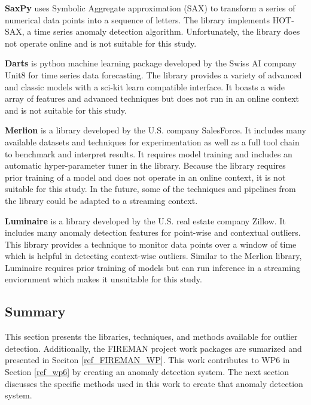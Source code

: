 \textbf{SaxPy} \parencite{senin2018grammarviz-saxpy} uses Symbolic Aggregate approximation (SAX) to transform a series of numerical data points into a sequence of letters. The library implements HOT-SAX, a time series anomaly detection algorithm. Unfortunately, the library does not operate online and is not suitable for this study.


\textbf{Darts} \parencite{herzen2021darts} is python machine learning package developed by the Swiss AI company Unit8 for time series data forecasting. The library provides a variety of advanced and classic models with a sci-kit learn compatible interface. It boasts a wide array of features and advanced techniques but does not run in an online context and is not suitable for this study.

\textbf{Merlion} \parencite{bhatnagar2021merlion} is a library developed by the U.S. company SalesForce. It includes many available datasets and techniques for experimentation as well as a full tool chain to benchmark and interpret results. It requires model training and includes an automatic hyper-parameter tuner in the library. Because the library requires prior training of a model and does not operate in an online context, it is not suitable for this study. In the future, some of the techniques and pipelines from the library could be adapted to a streaming context.

\textbf{Luminaire} \parencite{chakraborty2020building-luminaire} is a library developed by the U.S. real estate company Zillow. It includes many anomaly detection features for point-wise and contextual outliers. This library provides a technique to monitor data points over a window of time which is helpful in detecting context-wise outliers. Similar to the Merlion library, Luminaire requires prior training of models but can run inference in a streaming enviornment which makes it unsuitable for this study.

\subsection{Summary}
This section presents the libraries, techniques, and methods available for outlier detection.
Additionally, the FIREMAN project work packages are sumarized and presented in Seciton \ref{ref_FIREMAN_WP}.
This work contributes to WP6 in Section \ref{ref_wp6} by creating an anomaly detection system.
The next section discusses the specific methods used in this work to create that anomaly detection system.


